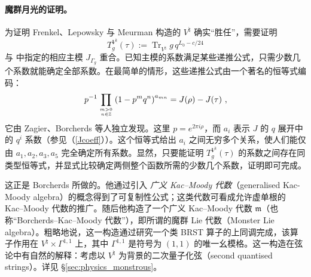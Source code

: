 \documentclass[11pt,a4paper,fontset=windows]{ctexart}
\numberwithin{equation}{section}
\newcommand{\myparagraph}[1]{\paragraph{#1}\mbox\\}
\newcommand{\ZZ}{\mathbb{Z}}
\newcommand{\tr}{\operatorname{Tr}}
\newcommand{\be}{\begin{equation}}
\newcommand{\ee}{\end{equation}}
\newcommand{\eq}[1]{(\ref{#1})}
\begin{document}
\myparagraph{魔群月光的证明。}
为证明 Frenkel、Lepowsky 与 Meurman 构造的 $V^\natural$ 确实“胜任”，需要证明
\be
T_g^{V^\natural}(\tau):= \tr_{V^\natural} g \, q^{L_0-c/24} 
\ee
与 \cite{conway_norton} 中指定的相应主模 $J_{\Gamma_g}$ 重合。已知主模的系数满足某些递推公式，只需少数几个系数就能确定全部系数。在最简单的情形，这些递推公式由一个著名的恒等式编码：
\begin{equation}
\label{eq:replicability_J}
p^{-1}\prod_{m>0\atop n\in\ZZ}\left(1-p^mq^n\right)^{a_{mn}}=J(\rho)-J(\tau)~,
\end{equation}
它由 Zagier、Borcherds 等人独立发现。这里 $p=e^{2\pi i\rho}$，而 $a_i$ 表示 $J$ 的 $q$ 展开中的 $q^i$ 系数（参见（\ref{Jcoeff}））。这个恒等式给出 $a_i$ 之间无穷多个关系，使人们能仅由 $a_1,a_2,a_3,a_5$ 完全确定所有系数。显然，只要能证明 $T_g^{V^\natural}(\tau)$ 的系数之间存在同类型恒等式，并显式比较确定两侧整个函数所需的少数几个系数，证明即可完成。



这正是 Borcherds 所做的。他通过引入 \emph{广义 Kac–Moody 代数}（generalised Kac-Moody algebra）的概念得到了可复制性公式；这类代数可看成允许虚单根的 Kac–Moody 代数的推广。随后他构造了一个广义 Kac–Moody 代数 $\mathfrak{m}$（也称“Borcherds–Kac–Moody 代数”），即所谓的魔群 Lie 代数（Monster Lie algebra）。粗略地说，这一构造通过研究一个类 BRST 算子的上同调完成，该算子作用在 $V^\natural\times\Gamma^{1,1}$ 上，其中 $\Gamma^{1,1}$ 是符号为 $(1,1)$ 的唯一幺模格。这一构造在弦论中有自然的解释：考虑以 $V^\natural$ 为背景的二次量子化弦（second quantised strings）。详见 \S\ref{sec:physics_monstrous}。

\end{document}
